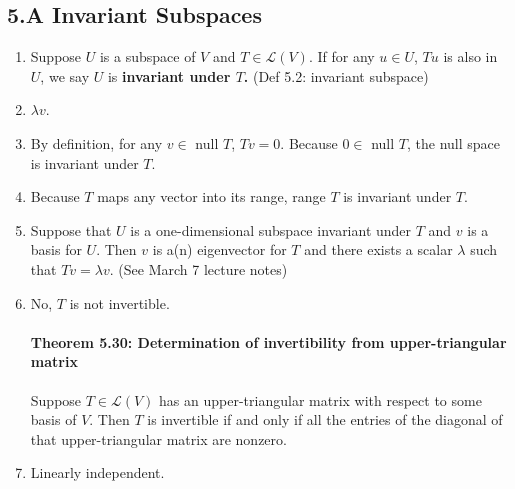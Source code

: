 \documentclass[11pt]{article}
\begin{document}
\subsection*{5.A Invariant Subspaces}
\begin{enumerate}
	\item Suppose $U$ is a subspace of $V$ and $T \in \mathcal{L}(V)$. If for any $u \in U$, $Tu$ is also in $U$, we say $U$ is \textbf{invariant under $T$.} (Def 5.2: invariant subspace)
	\item $\lambda v$. 
	\item By definition, for any $v \in$ null $T$, $Tv = 0$. Because $0 \in $ null $T$, the null space is invariant under $T$.
	\item Because $T$ maps any vector into its range, range $T$ is invariant under $T$.
	\item Suppose that $U$ is a one-dimensional subspace invariant under $T$ and $v$ is a basis for $U$. Then $v$ is a(n) eigenvector for $T$ and there exists a scalar $\lambda$ such that $Tv = \lambda v$. (See March 7 lecture notes)
	\item No, $T$ is not invertible.
	\paragraph{Theorem 5.30: Determination of invertibility from upper-triangular matrix}
	Suppose $T \in \mathcal{L}(V)$ has an upper-triangular matrix with respect to some basis of $V$. Then $T$ is invertible if and only if all the entries of the diagonal of that upper-triangular matrix are nonzero.
	\item Linearly independent.
\end{enumerate}
\end{document}
